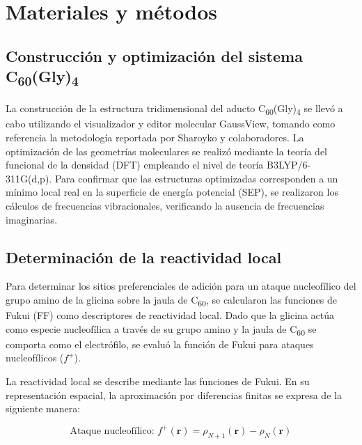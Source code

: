 \titleformat{\chapter}[display]
  {\normalfont\bfseries}{}{0pt}{\Large} %
\chapter{Materiales y métodos}
\section{Construcción y optimización del sistema C\textsubscript{60}(Gly)\textsubscript{4}}
La construcción de la estructura tridimensional del aducto C\textsubscript{60}(Gly)\textsubscript{4} se llevó a cabo utilizando el visualizador y editor molecular GaussView, tomando como referencia la metodología reportada por Sharoyko y colaboradores. La optimización de las geometrías moleculares se realizó mediante la teoría del funcional de la densidad (DFT) empleando el nivel de teoría B3LYP/6-311G(d,p). Para confirmar que las estructuras optimizadas corresponden a un mínimo local real en la superficie de energía potencial (SEP), se realizaron los cálculos de frecuencias vibracionales, verificando la ausencia de frecuencias imaginarias.
\section{Determinación de la reactividad local}
Para determinar los sitios preferenciales de adición para un ataque nucleofílico del grupo amino de la glicina sobre la jaula de C\textsubscript{60}, se calcularon las funciones de Fukui (FF) como descriptores de reactividad local. Dado que la glicina actúa como especie nucleofílica a través de su grupo amino y la jaula de C\textsubscript{60} se comporta como el electrófilo, se evaluó la función de Fukui para ataques nucleofílicos ($f^+$). 

La reactividad local se describe mediante las funciones de Fukui. En su representación espacial, la aproximación por diferencias finitas se expresa de la siguiente manera:

\begin{equation}
    \text{Ataque nucleofílico: } f^+(\mathbf{r}) = \rho_{N+1}(\mathbf{r}) - \rho_N(\mathbf{r})
\end{equation}

